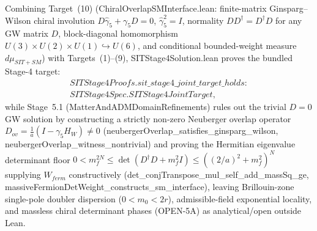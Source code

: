 \documentclass[american,11pt,letterpaper]{article}
\def\mathrm#1{#1}%
\def\texttt#1{#1}%
\begin{document}
Combining Target~\texttt{(10)} (\texttt{Chiral\allowbreak{}Overlap\allowbreak{}SMInterface.\allowbreak{}lean}: finite-matrix Ginsparg--Wilson chiral involution $D\hat{\gamma}_5 + \gamma_5 D = 0$, $\hat{\gamma}_5^2 = I$, normality $D D^\dagger = D^\dagger D$ for any GW matrix $D$, block-diagonal homomorphism $U(3)\times U(2)\times U(1) \hookrightarrow U(6)$, and conditional bounded-weight measure $d\mu_{\mathrm{SIT+SM}}$) with Targets~\texttt{(1)}--\texttt{(9)}, \texttt{SITStage4\allowbreak{}Solution.\allowbreak{}lean} proves the bundled Stage-4 target:
\begin{gather*}
\texttt{SITStage4Proofs.sit\_stage4\_joint\_target\_holds :}\\
\texttt{SITStage4Spec.SITStage4JointTarget},
\end{gather*}
while Stage~5.1 (\texttt{Matter\allowbreak{}And\allowbreak{}ADMDomain\allowbreak{}Refinements}) rules out the trivial $D = 0$ GW solution by constructing a strictly non-zero Neuberger overlap operator $D_{\mathrm{ov}} = \frac{1}{a}(I - \gamma_5 H_W) \ne 0$ (\texttt{neuberger\allowbreak{}Overlap\_\allowbreak{}satisfies\_\allowbreak{}ginsparg\_\allowbreak{}wilson}, \texttt{neuberger\allowbreak{}Overlap\_\allowbreak{}witness\_\allowbreak{}nontrivial}) and proving the Hermitian eigenvalue determinant floor $0 < m_f^{2N} \le \det(D^\dagger D + m_f^2 I) \le ((2/a)^2 + m_f^2)^N$ supplying $W_{\mathrm{ferm}}$ constructively (\texttt{det\_\allowbreak{}conj\allowbreak{}Transpose\_\allowbreak{}mul\_\allowbreak{}self\_\allowbreak{}add\_\allowbreak{}mass\allowbreak{}Sq\_\allowbreak{}ge}, \texttt{massive\allowbreak{}Fermion\allowbreak{}Det\allowbreak{}Weight\_\allowbreak{}constructs\_\allowbreak{}sm\_\allowbreak{}interface}), leaving Brillouin-zone single-pole doubler dispersion ($0 < m_0 < 2r$), admissible-field exponential locality, and massless chiral determinant phases (\texttt{OPEN-5A}) as analytical/open outside Lean.
\end{document}
